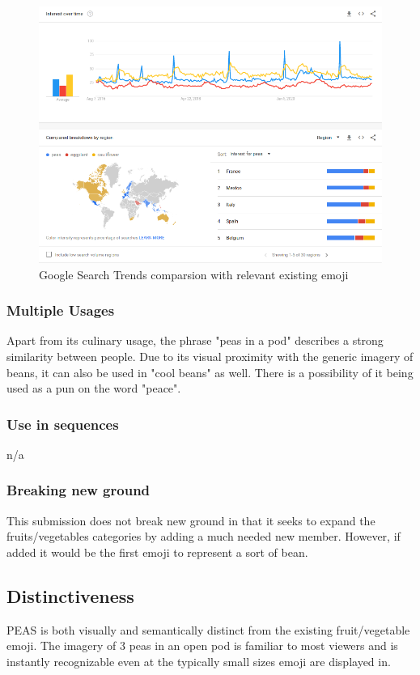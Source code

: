 \documentclass[oneside]{article}
\begin{document}
\begin{figure}[!htb]
\includegraphics[width=12cm]{analytics.png}
\caption{Google Search Trends comparsion with relevant existing emoji}
\label{fig:google}
\end{figure}


\subsubsection{Multiple Usages}
Apart from its culinary usage, the phrase "peas in a pod" describes a strong
similarity between people. Due to its visual proximity with the generic imagery
of beans, it can also be used in "cool beans" as well. There is a possibility of
it being used as a pun on the word "peace".

\subsubsection{Use in sequences}
n/a

\subsubsection{Breaking new ground}
This submission does not break new ground in that it seeks to expand the
fruits/vegetables categories by adding a much needed new member. However, if
added it would be the first emoji to represent a sort of bean.

\subsection{Distinctiveness}
PEAS is both visually and semantically distinct from the existing
fruit/vegetable emoji. The imagery of 3 peas in an open pod is familiar to most
viewers and is instantly recognizable even at the typically small sizes emoji
are displayed in.
\end{document}
